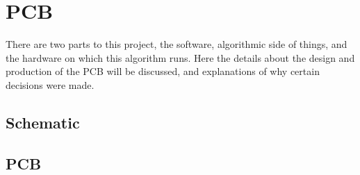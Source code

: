 \section{PCB}

There are two parts to this project, the software, algorithmic side of things, and the hardware on which this algorithm runs.
Here the details about the design and production of the PCB will be discussed, and explanations of why certain decisions were made.

\subsection{Schematic}

\subsection{PCB}
